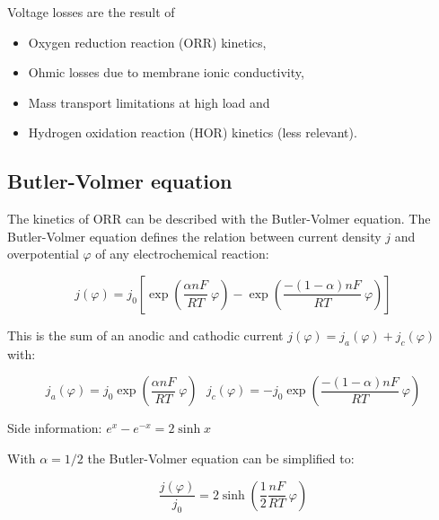\documentclass[11pt,a4paper,english,twoside]{scrreprt}
\begin{document}
Voltage losses are the result of
\begin{itemize}
	\item Oxygen reduction reaction (ORR) kinetics,
	\item Ohmic losses due to membrane ionic conductivity,
	\item Mass transport limitations at high load and
	\item Hydrogen oxidation reaction (HOR) kinetics (less relevant).
\end{itemize}



\subsection{Butler-Volmer equation}
\label{sec:ButlerVolmer}

The kinetics of ORR can be described with the Butler-Volmer equation. The Butler-Volmer equation defines the relation between current density $j$ and overpotential $\varphi$ of any electrochemical reaction:

\[
j(\varphi) = j_0 \left[\exp\left(\frac{\alpha n F}{RT}\: \varphi \right) - \exp\left(\frac{-(1-\alpha) n F}{RT}\: \varphi \right) \right]
\]

This is the sum of an anodic and cathodic current $j(\varphi) = j_a(\varphi) + j_c(\varphi)$ with:

\[
j_a(\varphi) = j_0 \exp\left(\frac{\alpha n F}{RT}\: \varphi \right) \ \ \
j_c(\varphi) = - j_0 \exp\left(\frac{-(1-\alpha) n F}{RT}\: \varphi \right)
\]

Side information: $e^x - e^{-x} = 2 \sinh x$

With $\alpha = 1/2$ the Butler-Volmer equation can be simplified to:

\[
\frac{j(\varphi)}{j_0} = 2 \sinh \left( \frac12 \frac{n F}{RT}\: \varphi \right) 
\]
\end{document}
